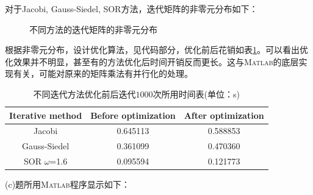 \documentclass[12pt,a4paper,UTF8]{ctexart}
\begin{document}
\begin{enumerate}
          对于Jacobi, Gauss-Siedel, SOR方法，迭代矩阵的非零元分布如下：
          \begin{figure}[H] \centering
              \caption{不同方法的迭代矩阵的非零元分布}
              \label{fig}
          \end{figure}


          根据非零元分布，设计优化算法，见代码部分，优化前后花销如表\ref{tb1}。可以看出优化效果并不明显，甚至有的方法优化后时间开销反而更长。这与\textsc{Matlab}的底层实现有关，可能对原来的矩阵乘法有并行化的处理。
          \begin{table}[H]
              \centering
              \begin{tabular}{|c|c|c|}
                  \hline
                  \textbf{Iterative method} & \textbf{Before optimization} & \textbf{After optimization} \\ \hline
                  Jacobi                    & 0.645113                     & 0.588853                    \\ \hline
                  Gauss-Siedel              & 0.361099                     & 0.470360                    \\ \hline
                  SOR $\omega$=1.6          & 0.095594                     & 0.121773                    \\ \hline
              \end{tabular}
              \caption{不同迭代方法优化前后迭代$1000$次所用时间表(单位：s)}
              \label{tb1}
          \end{table}
          (c)题所用\textsc{Matlab}程序显示如下：
          \begin{lstlisting}[frame=single]
% Jacobi Part:


\end{lstlisting}
\end{enumerate}
\end{document}
